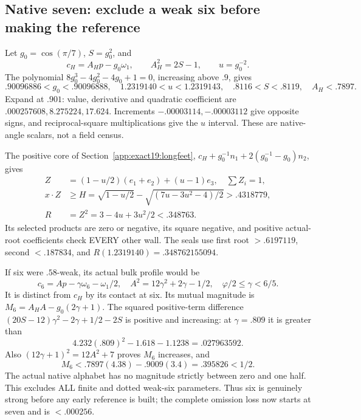 \documentclass[11pt]{article}
\theoremstyle{definition}
\theoremstyle{remark}
\begin{document}
\subsection{Native seven: exclude a weak six before making the reference}
\label{app:exact19:Dsevenearly}

Let \(g_0=\cos(\pi/7)\), \(S=g_0^2\), and
\[
 c_H=A_Hp-g_0\omega_1,\qquad A_H^2=2S-1,\qquad u=g_0^{-2}.
\]
The polynomial \(8g_0^3-4g_0^2-4g_0+1=0\), increasing above \(.9\),
gives
\[
 .90096886<g_0<.90096888,\quad 1.2319140<u<1.2319143,\quad
                           .8116<S<.8119,\quad A_H<.7897 .
\]
Expand at \(.901\): value, derivative and quadratic coefficient are
\(.000257608,8.275224,17.624\).
Increments \(-.00003114,-.00003112\) give opposite signs, and
reciprocal-square multiplications give the \(u\) interval.
These are native-angle scalars, not a field census.

The positive core of Section~\ref{app:exact19:longfeet},
\(c_H+g_0^{-1}n_1+2(g_0^{-1}-g_0)n_2\), gives
\[
\begin{split}
 Z&=(1-u/2)(e_1+e_2)+(u-1)e_3,\quad\sum Z_i=1,\\
 x\cdot Z&\ge H=\sqrt{1-u/2}-\sqrt{(7u-3u^2-4)/2}>.4318779,\\
 R&=Z^2=3-4u+3u^2/2<.348763 .
\end{split}
\]
Its selected products are zero or negative, its square negative, and
positive actual-root coefficients check EVERY other wall.
The seals use first root \(>.6197119\), second \(<.187834\), and
\(R(1.2319140)=.348762155094\).

If six were \(.58\)-weak, its actual bulk profile would be
\[
 c_6=Ap-\gamma\omega_6-\omega_1/2,\quad
 A^2=12\gamma^2+2\gamma-1/2,\quad \varphi/2\le\gamma<6/5 .
\]
It is distinct from \(c_H\) by its contact at six.
Its mutual magnitude is \(M_6=A_HA-g_0(2\gamma+1)\).
The squared positive-term difference
\((20S-12)\gamma^2-2\gamma+1/2-2S\) is positive and increasing:
at \(\gamma=.809\) it is greater than
\[
                    4.232(.809)^2-1.618-1.1238=.027963592 .
\]
Also \((12\gamma+1)^2=12A^2+7\) proves \(M_6\) increases, and
\[
                      M_6<.7897(4.38)-.9009(3.4)=.395826<1/2 .
\]
The actual native alphabet has no magnitude strictly between zero and
one half. This excludes ALL finite and dotted weak-six parameters.
Thus six is genuinely strong before any early reference is built;
the complete omission loss now starts at seven and is \(<.000256\).
\end{document}
